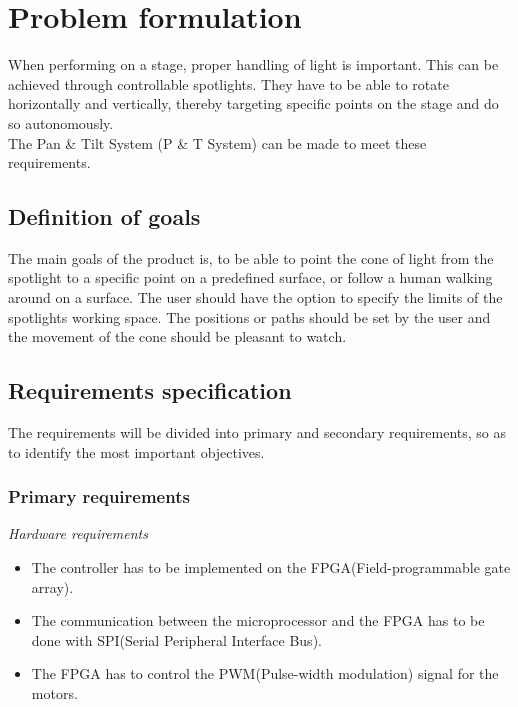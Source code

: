 \newpage

\section{Problem formulation}

When performing on a stage, proper handling of light is important. This can be achieved through controllable spotlights. They have to be able to rotate horizontally and vertically, thereby targeting specific points on the stage and do so autonomously.\\
The Pan \& Tilt System (P \& T System) can be made to meet these requirements.


\subsection{Definition of goals}
The main goals of the product is, to be able to point the cone of light from the spotlight to a specific point on a predefined surface, or follow a human walking around on a surface. The user should have the option to specify the limits of the spotlights working space. The positions or paths should be set by the user and the movement of the cone should be pleasant to watch.

\subsection{Requirements specification}
\label{sec:RequirementsSpecification}

The requirements will be divided into primary and secondary requirements, so as to identify the most important objectives.


\subsubsection{Primary requirements}
\label{sec:Primaryrequirements}

\textit{Hardware requirements}

\begin{itemize}

\item The controller has to be implemented on the FPGA(Field-programmable gate array).

\item The communication between the microprocessor and the FPGA has to be done with SPI(Serial Peripheral Interface Bus).

\item The FPGA has to control the PWM(Pulse-width modulation) signal for the motors.
\end{itemize}


